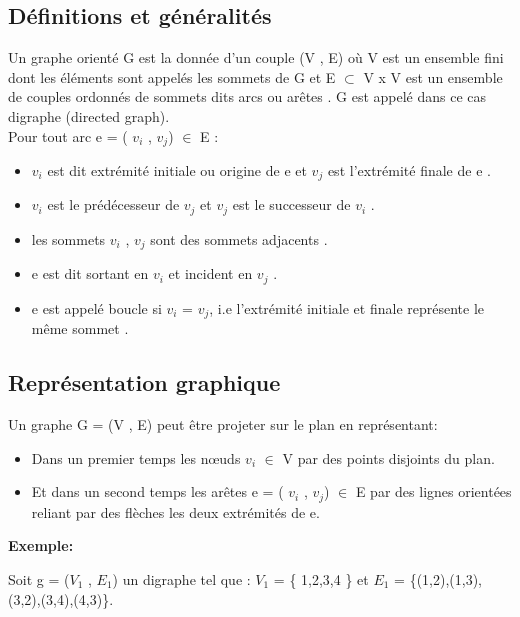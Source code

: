 
		\subsection{Définitions et généralités}
		Un graphe orienté G est la donnée d'un couple (V , E) où
		V est un ensemble fini dont les éléments sont appelés les sommets de G et 
		E  $\subset$ V x V est un ensemble de couples ordonnés de sommets dits arcs ou arêtes \citep{muller}. G est appelé dans ce cas digraphe (directed graph).\\
		 Pour tout arc e = ( $v_{i}$ , $v_{j}$) $\in$ E :
		 \begin{itemize}  
			\item $v_{i}$ est dit extrémité initiale ou origine de e et $v_{j}$ est l'extrémité finale de e \citep{muller}.
			
			\item $v_{i}$ est le prédécesseur de $v_{j}$ et $v_{j}$ est le successeur de $v_{i}$ \citep{IUTLyonInformatique}.
			
			\item les sommets $v_{i}$ , $v_{j}$ sont des sommets adjacents \citep{Pres}.
			
			\item e est dit sortant en $v_{i}$ et incident en $v_{j}$ \citep{Pres}.
			
			\item e est appelé boucle si $v_{i}$ = $v_{j}$, i.e l'extrémité initiale et finale représente le même sommet \citep{IUTLyonInformatique}.
			
		\end{itemize}
		 
		
		\subsection{Représentation graphique}
		
		
		Un graphe G = (V , E) peut être projeter sur le plan en représentant:
		\begin{itemize} 
		\item Dans un premier temps les nœuds $v_{i}$ $\in$ V par des points disjoints du plan.
		\item Et dans un second temps les arêtes e = ( $v_{i}$ , $v_{j}$) $\in$ E par des lignes orientées reliant par des flèches les deux extrémités de e. 
		\end{itemize}
		
		\textbf{Exemple:}
		
		Soit g = ($V_{1}$ , $E_{1}$) un digraphe tel que : $V_{1}$ = \{ 1,2,3,4 \} et  $E_{1}$ = \{(1,2),(1,3),(3,2),(3,4),(4,3)\}.
		
